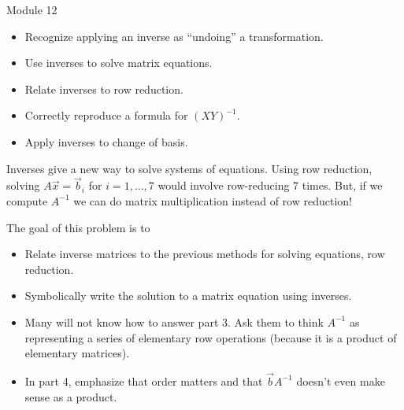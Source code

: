 \begin{lesson}

	Module 12

	\begin{itemize}
		\item Recognize applying an inverse as ``undoing'' a transformation.
		\item Use inverses to solve matrix equations.
		\item Relate inverses to row reduction.
		\item Correctly reproduce a formula for $(XY)^{-1}$.
		\item Apply inverses to change of basis.
	\end{itemize}

	Inverses give a new way to solve systems of equations. Using row reduction, solving $A\vec x=\vec b_i$ for $i=1,\ldots, 7$
	would involve row-reducing 7 times. But, if we compute $A^{-1}$ we can do matrix multiplication instead of row reduction!


\end{lesson}
	\bookonlynewpage
	\question
	\begin{annotation}
		\begin{goals}

			The goal of this problem is to
			\begin{itemize}
				\item Relate inverse matrices to the previous methods for solving
					equations, row reduction.
				\item Symbolically write the solution to a matrix equation using inverses.
			\end{itemize}
		\end{goals}

		\begin{notes}
			\begin{itemize}
				\item Many will not know how to answer part 3. Ask them
					to think $A^{-1}$ as representing a series of elementary row
					operations (because it is a product of elementary matrices).
				\item In part 4, emphasize that order matters and that $\vec bA^{-1}$ doesn't
					even make sense as a product.
			\end{itemize}
		\end{notes}
	\end{annotation}
